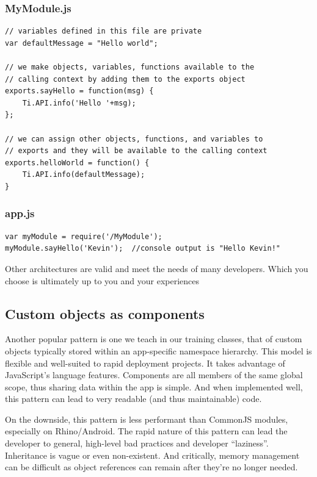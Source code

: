 \documentclass[11pt]{book}
\begin{document}
\subsubsection{MyModule.js}
\begin{lstlisting}[frame=single]
// variables defined in this file are private
var defaultMessage = "Hello world";

// we make objects, variables, functions available to the
// calling context by adding them to the exports object
exports.sayHello = function(msg) {
    Ti.API.info('Hello '+msg);
};

// we can assign other objects, functions, and variables to
// exports and they will be available to the calling context
exports.helloWorld = function() {
    Ti.API.info(defaultMessage);
}
\end{lstlisting}

\subsubsection{app.js}
\begin{lstlisting}[frame=single]
var myModule = require('/MyModule');
myModule.sayHello('Kevin');  //console output is "Hello Kevin!"
\end{lstlisting}

Other architectures are valid and meet the needs of many developers. Which you choose is ultimately up to you and your experiences

\subsection{Custom objects as components}
Another popular pattern is one we teach in our training classes, that of custom objects typically stored within an app-specific namespace hierarchy. This model is flexible and well-suited to rapid deployment projects. It takes advantage of JavaScript's language features. Components are all members of the same global scope, thus sharing data within the app is simple. And when implemented well, this pattern can lead to very readable (and thus maintainable) code.

On the downside, this pattern is less performant than CommonJS modules, especially on Rhino/Android. The rapid nature of this pattern can lead the developer to general, high-level bad practices and developer ``laziness''. Inheritance is vague or even non-existent. And critically, memory management can be difficult as object references can remain after they're no longer needed.
\end{document}
